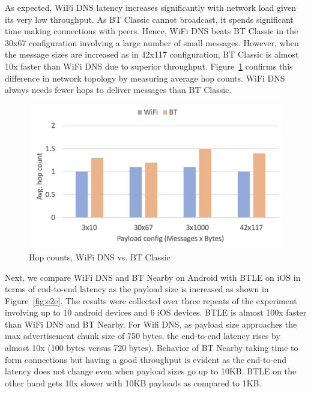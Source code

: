 \documentclass[conference]{IEEEtran}
\begin{document}
As expected, WiFi DNS latency increases significantly with network
load given its very low throughput. As BT Classic cannot broadcast, it
spends significant time making connections with peers.  Hence, WiFi
DNS beats BT Classic in the 30x67 configuration involving a large
number of small messages. However, when the message sizes are
increased as in 42x117 configuration, BT Classic is almost 10x faster
than WiFi DNS due to superior
throughput. Figure~\ref{fig:variety_hops} confirms this difference in
network topology by measuring average hop counts. WiFi DNS always
needs fewer hops to deliver messages than BT Classic.
%
\begin{figure}[htbp]
\centerline{\includegraphics[width=\columnwidth]{figs/variety_hops}}
\caption{Hop counts, WiFi DNS vs. BT Classic}
\label{fig:variety_hops}
\end{figure}
%

Next, we compare WiFi DNS and BT Nearby on Android with BTLE on iOS in
terms of end-to-end latency as the payload size is increased as shown
in Figure~\ref{fig:e2e}. The results were collected over three repeats
of the experiment involving up to 10 android devices and 6 iOS
devices. BTLE is almost 100x faster than WiFi DNS and BT Nearby. For
Wifi DNS, as payload size approaches the max advertisement chunk size
of 750 bytes, the end-to-end latency rises by almost 10x (100 bytes
versus 720 bytes). Behavior of BT Nearby taking time to form
connections but having a good throughput is evident as the end-to-end
latency does not change even when payload sizes go up to 10KB. BTLE on
the other hand gets 10x slower with 10KB payloads as compared to 1KB.
\end{document}
